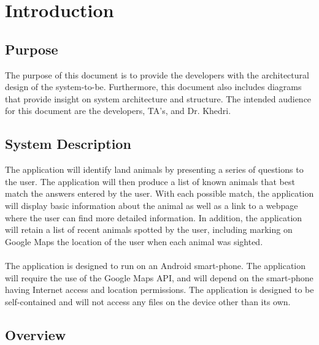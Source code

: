 \documentclass[]{article}
\begin{document}
\section{Introduction}
\label{sec:introduction}


\subsection{Purpose}
\label{sub:purpose}

The purpose of this document is to provide the developers with the architectural design of the system-to-be. Furthermore, this document also includes diagrams that provide insight on system architecture and structure. The intended audience for this document are the developers, TA's, and Dr. Khedri.


\subsection{System Description}
\label{sub:system_description}

The application will identify land animals by presenting a series of questions to the user. The application will then produce a list of known animals that best match the answers entered by the user. With each possible match, the application will display basic information about the animal as well as a link to a webpage where the user can find more detailed information. In addition, the application will retain a list of recent animals spotted by the user, including marking on Google Maps the location of the user when each animal was sighted.
\\
\\
The application is designed to run on an Android smart-phone. The application will require the use of the Google Maps API, and will depend on the smart-phone having Internet access and location permissions. The application is designed to be self-contained and will not access any files on the device other than its own.


\subsection{Overview}
\label{sub:overview}
\end{document}
